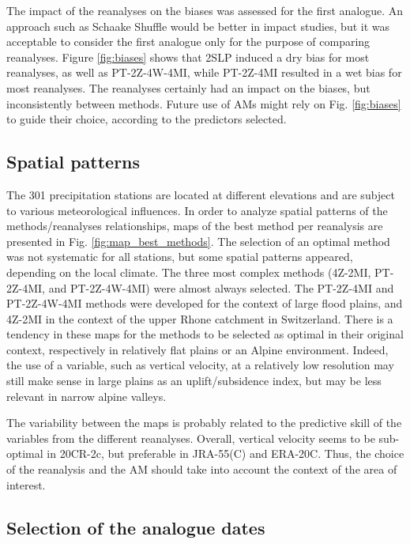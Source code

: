\documentclass{ametsoc}
\begin{document}
	The impact of the reanalyses on the biases was assessed for the first analogue. An approach such as Schaake Shuffle \citep{Clark2004a} would be better in impact studies, but it was acceptable to consider the first analogue only for the purpose of comparing reanalyses. Figure \ref{fig:biases} shows that 2SLP induced a dry bias for most reanalyses, as well as PT-2Z-4W-4MI, while PT-2Z-4MI resulted in a wet bias for most reanalyses. The reanalyses certainly had an impact on the biases, but inconsistently between methods. Future use of AMs might rely on Fig. \ref{fig:biases} to guide their choice, according to the predictors selected.
	
	
	\subsection{Spatial patterns}
	
	The 301 precipitation stations are located at different elevations and are subject to various meteorological influences. In order to analyze spatial patterns of the methods/reanalyses relationships, maps of the best method per reanalysis are presented in Fig. \ref{fig:map_best_methods}. The selection of an optimal method was not systematic for all stations, but some spatial patterns appeared, depending on the local climate. The three most complex methods (4Z-2MI, PT-2Z-4MI, and PT-2Z-4W-4MI) were almost always selected. The PT-2Z-4MI and PT-2Z-4W-4MI methods were developed for the context of large flood plains, and 4Z-2MI in the context of the upper Rhone catchment in Switzerland. There is a tendency in these maps for the methods to be selected as optimal in their original context, respectively in relatively flat plains or an Alpine environment. Indeed, the use of a variable, such as vertical velocity, at a relatively low resolution may still make sense in large plains as an uplift/subsidence index, but may be less relevant in narrow alpine valleys.
	
	The variability between the maps is probably related to the predictive skill of the variables from the different reanalyses. Overall, vertical velocity seems to be sub-optimal in 20CR-2c, but preferable in JRA-55(C) and ERA-20C. Thus, the choice of the reanalysis and the AM should take into account the context of the area of interest.
	
	
	\subsection{Selection of the analogue dates}
	
\end{document}
